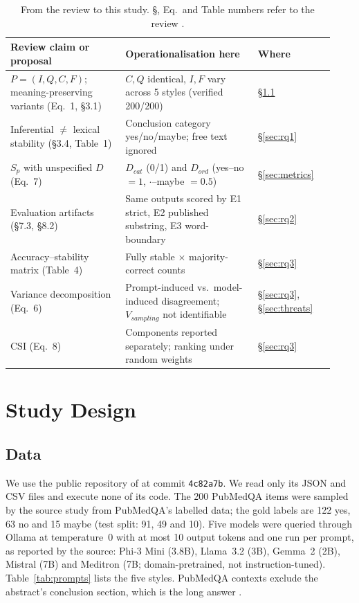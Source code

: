 \documentclass[acmsmall]{acmart}
\begin{document}
\begin{table}[t]
\caption{From the review to this study. \S, Eq.\ and Table numbers refer to the review \cite{joshi2026review}.}\label{tab:bridge}
\small
\begin{tabular}{@{}L{0.33\linewidth}L{0.38\linewidth}L{0.22\linewidth}@{}}
\toprule
Review claim or proposal & Operationalisation here & Where \\
\midrule
$P=(I,Q,C,F)$; meaning-preserving variants (Eq.~1, \S3.1) & $C,Q$ identical, $I,F$ vary across 5 styles (verified 200/200) & \S\ref{sec:data} \\
Inferential $\neq$ lexical stability (\S3.4, Table~1) & Conclusion category yes/no/maybe; free text ignored & \S\ref{sec:rq1} \\
$S_p$ with unspecified $D$ (Eq.~7) & $D_{cat}$ (0/1) and $D_{ord}$ (yes--no $=1$, $\cdot$--maybe $=0.5$) & \S\ref{sec:metrics} \\
Evaluation artifacts (\S7.3, \S8.2) & Same outputs scored by E1 strict, E2 published substring, E3 word-boundary & \S\ref{sec:rq2} \\
Accuracy--stability matrix (Table~4) & Fully stable $\times$ majority-correct counts & \S\ref{sec:rq3} \\
Variance decomposition (Eq.~6) & Prompt-induced vs.\ model-induced disagreement; $V_{sampling}$ not identifiable & \S\ref{sec:rq3}, \S\ref{sec:threats} \\
CSI (Eq.~8) & Components reported separately; ranking under random weights & \S\ref{sec:rq3} \\
\bottomrule
\end{tabular}
\end{table}

\section{Study Design}\label{sec:design}
\subsection{Data}\label{sec:data}
We use the public repository of \cite{hariprasad2026clinical} at commit \texttt{4c82a7b}. We read only its JSON and CSV files and execute none of its code. The 200 PubMedQA items were sampled by the source study from PubMedQA's labelled data; the gold labels are 122 yes, 63 no and 15 maybe (test split: 91, 49 and 10). Five models were queried through Ollama at temperature~0 with at most 10 output tokens and one run per prompt, as reported by the source: Phi-3 Mini (3.8B), Llama~3.2 (3B), Gemma~2 (2B), Mistral (7B) and Meditron (7B; domain-pretrained, not instruction-tuned). Table~\ref{tab:prompts} lists the five styles. PubMedQA contexts exclude the abstract's conclusion section, which is the long answer \cite{jin2019pubmedqa}.
\end{document}
